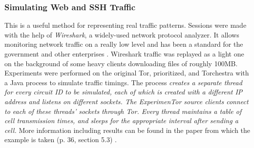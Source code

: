 \documentclass[a4paper, 12pt, titlepage]{article}
\begin{document}
\subsubsection{Simulating Web and SSH Traffic}
This is a useful method for representing real traffic patterns. Sessions were made with the help of \textit{Wireshark}, a widely-used network protocol analyzer. It allows monitoring network traffic on a really low level and has been a standard for the government and other enterprises \cite{Wireshark}. Wireshark traffic was replayed as a light one on the background of some heavy clients downloading files of roughly 100MB. Experiments were performed on the original Tor, prioritized, and Torchestra with a Java process to simulate traffic timings. The process \textit{creates a separate thread for every circuit ID to be simulated, each of which is created with a different IP address and listens on different sockets. The ExperimenTor source clients connect to each of these threads' sockets through Tor. Every thread maintains a table of cell transmission times, and sleeps for the appropriate interval after sending a cell.} More information including results can be found in the paper from which the example is taken (p. 36, section 5.3) \cite{TorTrafficReduce}.
\end{document}
